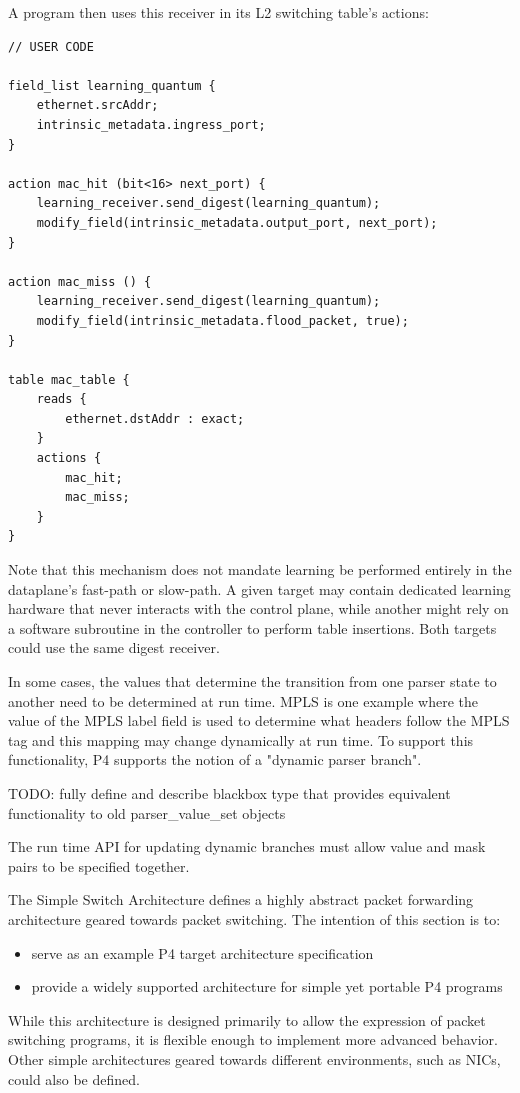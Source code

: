\documentclass[12pt]{article}
\begin{document}
A program then uses this receiver in its L2 switching table's actions:

\begin{lstlisting}[style=P4style]
// USER CODE

field_list learning_quantum {
    ethernet.srcAddr;
    intrinsic_metadata.ingress_port;
}

action mac_hit (bit<16> next_port) {
    learning_receiver.send_digest(learning_quantum);
    modify_field(intrinsic_metadata.output_port, next_port);
}

action mac_miss () {
    learning_receiver.send_digest(learning_quantum);
    modify_field(intrinsic_metadata.flood_packet, true);
}

table mac_table {
    reads {
        ethernet.dstAddr : exact;
    }
    actions {
        mac_hit;
        mac_miss;
    }
}
\end{lstlisting}

Note that this mechanism does not mandate learning be performed entirely in the
dataplane's fast-path or slow-path. A given target may contain dedicated
learning hardware that never interacts with the control plane, while another
might rely on a software subroutine in the controller to perform table
insertions. Both targets could use the same digest receiver.


In some cases, the values that determine the transition from one
parser state to another need to be determined at run time. MPLS is one
example where the value of the MPLS label field is used to determine
what headers follow the MPLS tag and this mapping may change
dynamically at run time. To support this functionality, P4 supports
the notion of a "dynamic parser branch". 

TODO: fully define and describe blackbox type that provides equivalent
functionality to old parser_value_set objects

The run time API for updating dynamic branches must allow value and mask
pairs to be specified together.


The Simple Switch Architecture defines a highly abstract packet forwarding
architecture geared towards packet switching. The intention of this section is
to:
\begin{itemize}
\item
serve as an example P4 target architecture specification
\item
provide a widely supported architecture for simple yet portable
P4 programs
\end{itemize}
While this architecture is designed primarily to allow the expression of packet
switching programs, it is flexible enough to implement more advanced behavior.
Other simple architectures geared towards different environments, such as NICs,
could also be defined.
\end{document}
